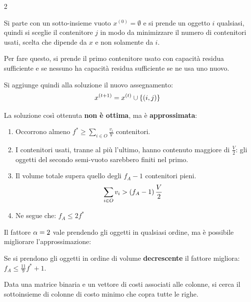 \documentclass[\main/main.tex]{subfiles}
\begin{document}
\begin{multicols}{2}
\begin{definition}
    Si parte con un sotto-insieme vuoto \(x^{(0)} = \emptyset\) e si prende un oggetto \(i\) qualsiasi, quindi si sceglie il contenitore \(j\)  in modo da minimizzare il numero di contenitori usati, scelta che dipende da \(x\) e non solamente da \(i\).
    
    Per fare questo, si prende il primo contenitore usato con capacità residua sufficiente e se nessuno ha capacità residua sufficiente se ne usa uno nuovo.
    
    Si aggiunge quindi alla soluzione il nuovo assegnamento:
    \[
        x^{(t+1)} = x^{(t)} \cup \left\{\left(i,j\right)\right\}
    \]
\end{definition}
\begin{analysis}
    La soluzione così ottenuta \textbf{non è ottima}, ma è \textbf{approssimata}:
    \begin{enumerate}
        \item Occorrono almeno \(f^*\geq \sum_{i \in O} \frac{v_i}{V}\) contenitori.
        \item I contenitori usati, tranne al più l'ultimo, hanno contenuto maggiore di \(\frac{V}{2}\): gli oggetti del secondo semi-vuoto sarebbero finiti nel primo.
        \item Il volume totale supera quello degli \(f_A -1 \) contenitori pieni.
        \[
            \sum_{i \in O} v_i > \left(f_A - 1\right) \frac{V}{2}
        \]
        \item Ne segue che: \(f_A \leq 2f^*\)
    \end{enumerate}
\end{analysis}
\begin{observation}
    Il fattore \(\alpha = 2\) vale prendendo gli oggetti in qualsiasi ordine, ma è possibile migliorare l'approssimazione:
    
    Se si prendono gli oggetti in ordine di volume \textbf{decrescente} il fattore migliora: \(f_A \leq \frac{11}{9}f^* + 1\).
\end{observation}
\begin{definition}
    Data una matrice binaria e un vettore di costi associati alle colonne, si cerca il sottoinsieme di colonne di costo minimo che copra tutte le righe.
    

\end{definition}
\end{multicols}
\end{document}
